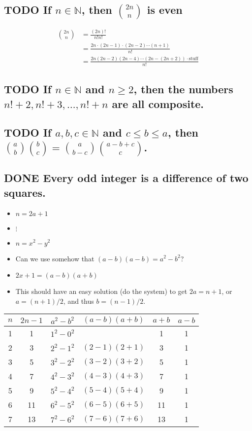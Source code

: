 \documentclass[11pt, oneside]{amsart}
\begin{document}
\subsection{{\bfseries\sffamily TODO} If \(n \in \mathbb{N}\), then \({2n \choose n}\) is even}
\label{sec:org1489c03}

\begin{align*}
{2n \choose n} &= \frac{(2n)!}{n!n!} \\ &= \frac{2n \cdot (2n-1) \cdot (2n-2) \dotsb  (n+1)}{ n! } \\ 
&= \frac{2n (2n-2) (2n-4) \dotsb (2n-(2n+2)) \cdot \text{stuff}}{n!} 
\end{align*}


\subsection{{\bfseries\sffamily TODO} If \(n \in \mathbb{N}\) and \(n \geq 2\), then the numbers \(n!+2, n!+3, \dotsc, n!+n\) are all composite.}
\label{sec:orgb42add0}

\subsection{{\bfseries\sffamily TODO} If \(a,b,c \in \mathbb{N}\) and \(c \leq b \leq a\), then \({a \choose b} {b \choose c} = {a \choose b-c} {a-b+c \choose c}\).}
\label{sec:org01da224}

\subsection{{\bfseries\sffamily DONE} Every odd integer is a difference of two squares.}
\label{sec:orgbc911b8}
\begin{itemize}
\item \(n = 2a+1\)
\item \(\vdots\)
\item \(n = x^2 - y^2\)
\item Can we use somehow that \((a-b)(a-b)=a^2-b^2\)?
\item \(2x+1 = (a-b)(a+b)\)
\item This should have an easy solution (do the system) to get \(2a = n + 1\), or \(a=(n+1)/2\), and thus \(b=(n-1)/2\).
\end{itemize}
\begin{center}
\begin{tabular}{|c|c|c|c|c|c|}
\hline
\(n\) & \(2n-1\) & \(a^2-b^2\) & \((a-b)(a+b)\) & \(a+b\) & \(a-b\)\\
\hline
1 & 1 & \(1^2 - 0^2\) &  & 1 & 1\\
2 & 3 & \(2^2 - 1^2\) & \((2-1)(2+1)\) & 3 & 1\\
3 & 5 & \(3^2 - 2^2\) & \((3-2)(3+2)\) & 5 & 1\\
4 & 7 & \(4^2 - 3^2\) & \((4-3)(4+3)\) & 7 & 1\\
5 & 9 & \(5^2 - 4^2\) & \((5-4)(5+4)\) & 9 & 1\\
6 & 11 & \(6^2 - 5^2\) & \((6-5)(6+5)\) & 11 & 1\\
7 & 13 & \(7^2 - 6^2\) & \((7-6)(7+6)\) & 13 & 1\\
\hline
\end{tabular}
\end{center}
\end{document}
